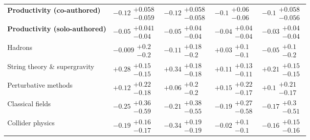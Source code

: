\begin{table}[H]
\begin{tabular}{lllll}
\textbf{Productivity (co-authored)} & $\bm{-0.12}\substack{+0.058 \\ -0.059}$ & $\bm{-0.12}\substack{+0.058 \\ -0.058}$ & $\bm{-0.1}\substack{+0.06 \\ -0.06}$ & $\bm{-0.1}\substack{+0.058 \\ -0.056}$ \\
\textbf{Productivity (solo-authored)} & $\bm{-0.05}\substack{+0.041 \\ -0.04}$ & $\bm{-0.05}\substack{+0.04 \\ -0.04}$ & $-0.04\substack{+0.04 \\ -0.04}$ & $-0.03\substack{+0.04 \\ -0.04}$ \\
\hline Hadrons & $-0.009\substack{+0.2 \\ -0.2}$ & $-0.11\substack{+0.18 \\ -0.2}$ & $+0.03\substack{+0.1 \\ -0.1}$ & $-0.05\substack{+0.1 \\ -0.2}$ \\
String theory \& supergravity & $\bm{+0.28}\substack{+0.15 \\ -0.15}$ & $\bm{+0.34}\substack{+0.18 \\ -0.18}$ & $+0.11\substack{+0.13 \\ -0.11}$ & $\bm{+0.21}\substack{+0.15 \\ -0.15}$ \\
Perturbative methods & $+0.12\substack{+0.22 \\ -0.18}$ & $+0.06\substack{+0.2 \\ -0.2}$ & $+0.15\substack{+0.22 \\ -0.17}$ & $+0.1\substack{+0.21 \\ -0.17}$ \\
Classical fields & $-0.25\substack{+0.36 \\ -0.59}$ & $-0.21\substack{+0.38 \\ -0.55}$ & $-0.19\substack{+0.27 \\ -0.58}$ & $-0.17\substack{+0.3 \\ -0.51}$ \\
Collider physics & $\bm{-0.19}\substack{+0.16 \\ -0.17}$ & $\bm{-0.34}\substack{+0.19 \\ -0.19}$ & $-0.02\substack{+0.1 \\ -0.1}$ & $\bm{-0.16}\substack{+0.15 \\ -0.16}$ \\

\end{tabular}
\end{table}
